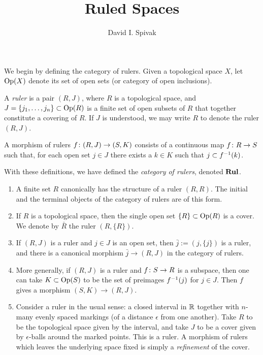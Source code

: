 \documentclass{amsart}
\def\Rul{{\bf Rul}}
\def\j{\bar{j}}
\begin{document}
\title{Ruled Spaces}

\author{David I. Spivak}

\maketitle

We begin by defining the category of rulers.  Given a topological space $X$, let $\textnormal{Op}(X)$ denote its set of open sets (or category of open inclusions).

\begin{definition}

A {\em ruler} is a pair $(R,J)$, where $R$ is a topological space, and $J=\{j_1,\ldots,j_n\}\subset\textnormal{Op}(R)$ is a finite set of open subsets of $R$ that together constitute a covering of $R$.  If $J$ is understood, we may write $R$ to denote the ruler $(R,J)$.

A morphism of rulers $f\colon (R,J)\rightarrow(S,K)$ consists of a continuous map $f\colon R\rightarrow S$ such that, for each open set $j\in J$ there exists a $k\in K$ such that $j\ss f^\m1(k)$.

With these definitions, we have defined the {\em category of rulers}, denoted $\Rul$.

\end{definition}

\begin{example}

\begin{enumerate}

\item A finite set $R$ canonically has the structure of a ruler $(R,R)$.  The initial and the terminal objects of the category of rulers are of this form.
\item If $R$ is a topological space, then the single open set $\{R\}\subset\textnormal{Op}(R)$ is a cover.  We denote by $\bar{R}$ the ruler $(R,\{R\})$.
\item If $(R,J)$ is a ruler and $j\in J$ is an open set, then $\j:=(j,\{j\})$ is a ruler, and there is a canonical morphism $\j\to (R,J)$ in the category of rulers. 
\item More generally, if $(R,J)$ is a ruler and $f\colon S\rightarrow R$ is a subspace, then one can take $K\subset\textnormal{Op}(S)$ to be the set of preimages $f^\m1(j)$ for $j\in J$.  Then $f$ gives a morphism $(S,K)\to(R,J)$.

\item Consider a ruler in the usual sense: a closed interval in ${\mathbb R}$ together with $n$-many evenly spaced markings (of a distance $\epsilon$ from one another).  Take $R$ to be the topological space given by the interval, and take $J$ to be a cover given by $\epsilon$-balls around the marked points.  This is a ruler.  A morphism of rulers which leaves the underlying space fixed is simply a {\em refinement} of the cover.

\end{enumerate}

\end{example}
\end{document}
